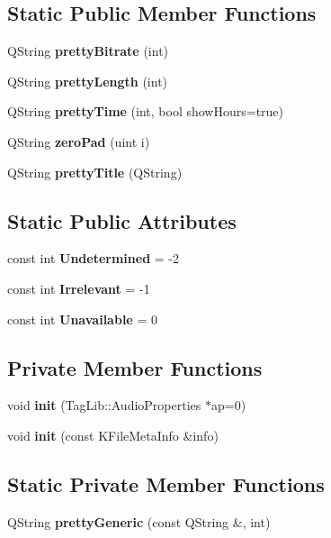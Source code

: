 \subsection*{Static Public Member Functions}
\begin{CompactItemize}
\item 
QString {\bf pretty\-Bitrate} (int)
\item 
QString {\bf pretty\-Length} (int)
\item 
QString {\bf pretty\-Time} (int, bool show\-Hours=true)
\item 
QString {\bf zero\-Pad} (uint i)
\item 
QString {\bf pretty\-Title} (QString)
\end{CompactItemize}
\subsection*{Static Public Attributes}
\begin{CompactItemize}
\item 
const int {\bf Undetermined} = -2
\item 
const int {\bf Irrelevant} = -1
\item 
const int {\bf Unavailable} = 0
\end{CompactItemize}
\subsection*{Private Member Functions}
\begin{CompactItemize}
\item 
void {\bf init} (Tag\-Lib::Audio\-Properties $\ast$ap=0)
\item 
void {\bf init} (const KFile\-Meta\-Info \&info)
\end{CompactItemize}
\subsection*{Static Private Member Functions}
\begin{CompactItemize}
\item 
QString {\bf pretty\-Generic} (const QString \&, int)
\end{CompactItemize}
